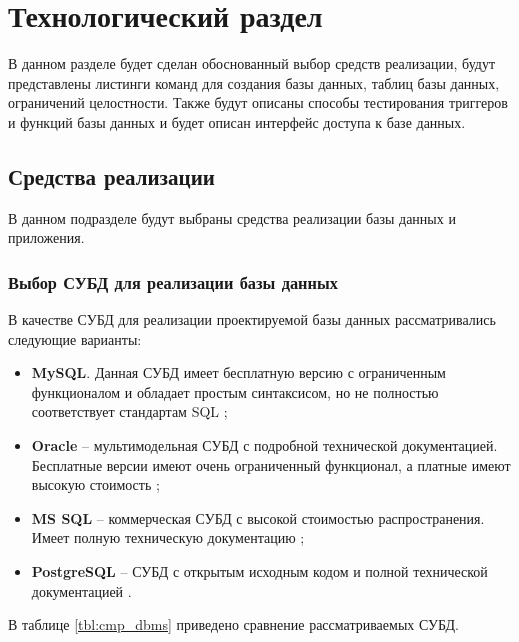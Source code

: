 \chapter{\label{implementation}Технологический раздел}

В данном разделе будет сделан обоснованный выбор средств реализации, будут представлены листинги команд для создания базы данных, таблиц базы данных, ограничений целостности. Также будут описаны способы тестирования триггеров и функций базы данных и будет описан интерфейс доступа к базе данных.

\section{Средства реализации}

В данном подразделе будут выбраны средства реализации базы данных и приложения.

\subsection{Выбор СУБД для реализации базы данных}

В качестве СУБД для реализации проектируемой базы данных рассматривались следующие варианты: 

\begin{itemize}
	\item \textbf{MySQL}. Данная СУБД имеет бесплатную версию с ограниченным функционалом и обладает простым синтаксисом, но не полностью соответствует стандартам SQL \cite{info_cmp_dbms};
	\item \textbf{Oracle} -- мультимодельная СУБД с подробной технической документацией. Бесплатные версии имеют очень ограниченный функционал, а платные имеют высокую стоимость \cite{info_cmp_dbms};
	\item \textbf{MS SQL} -- коммерческая СУБД с высокой стоимостью распространения. Имеет полную техническую документацию \cite{info_cmp_dbms};
	\item \textbf{PostgreSQL} -- СУБД с открытым исходным кодом и полной технической документацией \cite{info_cmp_dbms}. 
\end{itemize}

В таблице \ref{tbl:cmp_dbms} приведено сравнение рассматриваемых СУБД.

